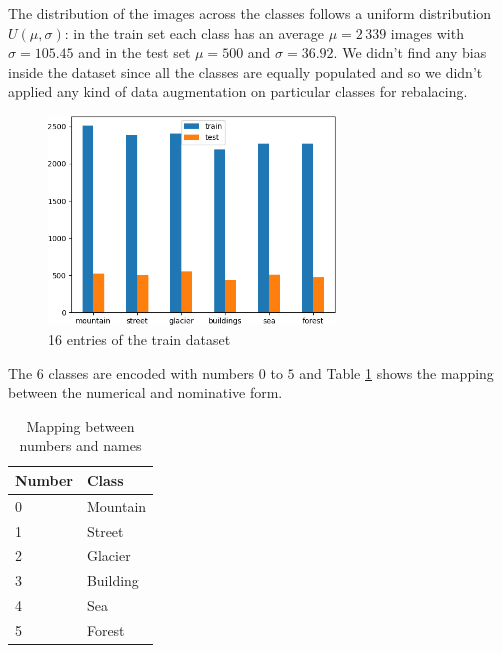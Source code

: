 \documentclass[compsoc]{IEEEtran}
\begin{document}
The distribution of the images across the classes follows a uniform distribution $U(\mu, \sigma)$: in the train set each class has an average $\mu = 2\,339$ images with $\sigma = 105.45$ and in the test set $\mu=500$ and $\sigma=36.92$. We didn't find any bias inside the dataset since all the classes are equally populated and so we didn't applied any kind of data augmentation on particular classes for rebalacing.


\begin{figure}[ht!]
\centering                                                                        
\includegraphics[width=3in]{../images/data.png}
\captionsetup{justification=centering}                                                                                         
\caption{16 entries of the train dataset}
\label{fig:data}                                                                                                                               
\end{figure}

The $6$ classes are encoded with numbers $0$ to $5$ and Table \ref{tab:encode} shows the mapping between the numerical and nominative form.



\begin{table}[ht!]
\centering
\begin{tabular}{|l|l|}
\hline
\rowcolor[HTML]{9698ED} 
{\color[HTML]{FFFFFF} \textbf{Number}} & {\color[HTML]{FFFFFF} \textbf{Class}} \\ \hline
0                                      & Mountain                              \\ \hline
1                                      & Street                                \\ \hline
2                                      & Glacier                               \\ \hline
3                                      & Building                              \\ \hline
4                                      & Sea                                   \\ \hline
5                                      & Forest                                \\ \hline
\end{tabular}
\caption{Mapping between numbers and names}
\label{tab:encode}
\end{table}
\end{document}
